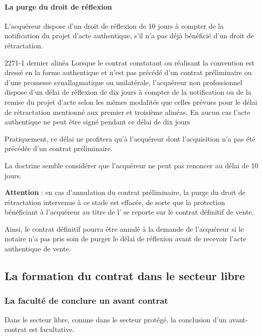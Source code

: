 			\paragraph{La purge du droit de réflexion}

				L’acquéreur dispose d’un droit de réflexion de 10 jours à compter de la notification du projet d’acte authentique, s’il n’a pas déjà bénéficié d’un droit de rétractation.

				\begin{citationArticle}[L]{2271-1 dernier alinéa}{\cch}
					Lorsque le contrat constatant ou réalisant la convention est dressé en la forme authentique et n'est pas précédé d'un contrat préliminaire ou d'une promesse synallagmatique ou unilatérale, l'acquéreur non professionnel dispose d'un délai de réflexion de dix jours à compter de la notification ou de la remise du projet d'acte selon les mêmes modalités que celles prévues pour le délai de rétractation mentionné aux premier et troisième alinéas. En aucun cas l'acte authentique ne peut être signé pendant ce délai de dix jours
				\end{citationArticle}

				Pratiquement, ce délai ne profitera qu’à l’acquéreur dont l’acquisition n’a pas été précédée d’un contrat préliminaire.

				La doctrine semble considérer que l’acquéreur ne peut pas renoncer au délai de 10 jours.

				\bigbreak\textbf{Attention} : en cas d’annulation du contrat préliminaire, la purge du droit de rétractation intervenue à ce stade est effacée, de sorte que la protection bénéficiant à l’acquéreur au titre de l’ se reporte sur le contrat définitif de vente.

				Ainsi, le contrat définitif pourra être annulé à la demande de l’acquéreur si le notaire n’a pas pris soin de purger le délai de réflexion avant de recevoir l’acte authentique de vente.


	\subsection{La formation du contrat dans le secteur libre}

		\subsubsection{La faculté de conclure un avant contrat}

			Dans le secteur libre, comme dans le secteur protégé, la conclusion d’un avant-contrat est facultative.


